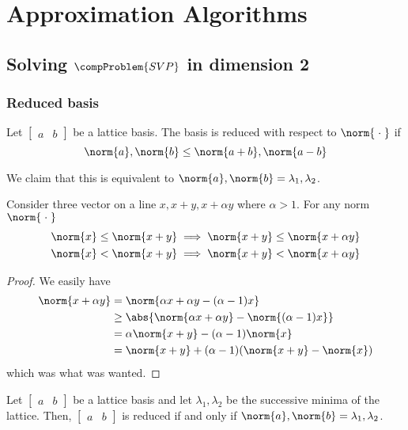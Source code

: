 \chapter{Approximation Algorithms}
\section{Solving \(\compProblem{SVP}\) in dimension 2}
\subsection{Reduced basis}
\begin{definition}
    Let \(\begin{bmatrix}
        a & b
    \end{bmatrix}\) be a lattice basis. The basis is reduced with respect to \(\norm{\; \cdot \;}\) if 
    \begin{equation*}
        \norm{a}, \norm{b} \leq \norm{a + b}, \norm{a - b}
    \end{equation*}
\end{definition}
We claim that this is equivalent to \(\norm{a}, \norm{b} = \lambda_1, \lambda_2\).
\begin{lemma}
    Consider three vector on a line \(x,x+y, x + \alpha y\) where \(\alpha > 1\). For any norm \(\norm{\; \cdot \;}\)
    \begin{align*}
        \norm{x} \leq \norm{x + y} &\implies \norm{x + y} \leq \norm{x + \alpha y}\\
        \norm{x} < \norm{x + y} &\implies \norm{x + y} < \norm{x + \alpha y}
    \end{align*}
\end{lemma}
\begin{proof}
    We easily have 
    \begin{align*}
        \norm{x + \alpha y} &= \norm{\alpha x + \alpha y - (\alpha - 1) x}\\
        &\geq \abs{\norm{\alpha x + \alpha y} - \norm{(\alpha - 1)x}}\\
        &= \alpha \norm{x + y} - (\alpha - 1)\norm{x}\\
        &= \norm{x + y} + (\alpha - 1)(\norm{x + y} - \norm{x})
    \end{align*}
    which was what was wanted.
\end{proof}

\begin{theorem}
    Let \(\begin{bmatrix}
        a & b
    \end{bmatrix}\) be a lattice basis and let \(\lambda_1, \lambda_2\) be the successive minima of the lattice. Then, \(\begin{bmatrix}
        a & b
    \end{bmatrix}\) is reduced if and only if \(\norm{a}, \norm{b} = \lambda_1,\lambda_2\).
\end{theorem}

